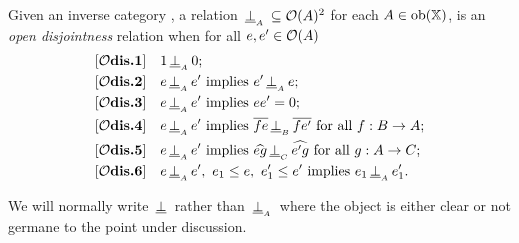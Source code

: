 \begin{definition}\label{def:disjointness_in_open_x}
  Given an inverse category \X, a relation $\,\underline{\perp}_{{}_{A}}\, \subseteq \mathcal{O}({A})^2$ for each $
  A \in \mathrm{ob}(\mathbb{X})$, is an \emph{open disjointness} relation when for all $e, e' \in \mathcal{O}({A})$
  \begin{align*}
    \axiom{$\mathcal{O}$dis}{1}\quad &1 \ocdperpsub{A} 0; \\
    \axiom{$\mathcal{O}$dis}{2}\quad &e \ocdperpsub{A} e' \text{ implies }e' \ocdperpsub{A} e;\\
    \axiom{$\mathcal{O}$dis}{3}\quad &e \ocdperpsub{A} e' \text{ implies }e e' = 0;\\
    \axiom{$\mathcal{O}$dis}{4}\quad &e \ocdperpsub{A} e' \text{ implies }\rst{f e} \ocdperpsub{B}
      \rst{f e'}\text{ for all }f:B \to A;\\
    \axiom{$\mathcal{O}$dis}{5}\quad &e \ocdperpsub{A} e' \text{ implies }\wrg{e g} \ocdperpsub{C}
      \wrg{e' g}\text{ for all }g:A \to C; \\
    \axiom{$\mathcal{O}$dis}{6}\quad &e \ocdperpsub{A} e',\ e_1 \le e,\ e_1' \le e'
      \text{ implies }e_1 \ocdperpsub{A} e_1'.
  \end{align*}
\end{definition}

We will normally write $\,\underline{\perp}\,$ rather than $\,\underline{\perp}_{{}_{A}}\,$ where the object is either clear or
not germane to the point under discussion.


